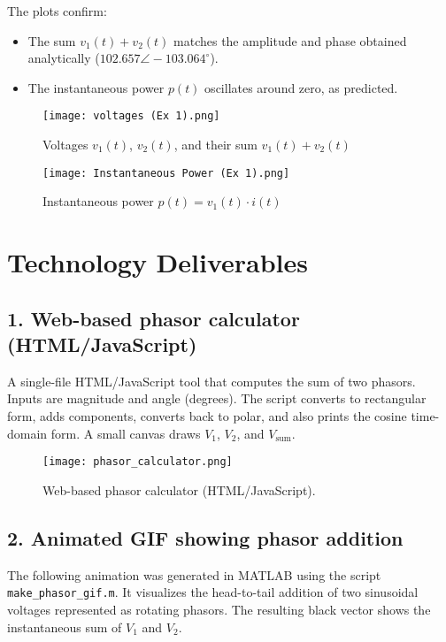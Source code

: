 \documentclass{article}
\begin{document}
The plots confirm:
\begin{itemize}
\item The sum \(v_1(t)+v_2(t)\) matches the amplitude and phase 
      obtained analytically (\(102.657\angle -103.064^\circ\)).
\item The instantaneous power \(p(t)\) oscillates around zero, as predicted.
\end{itemize}


\begin{figure}[H]
\centering
\texttt{[image: voltages (Ex 1).png]}
\caption{Voltages $v_1(t)$, $v_2(t)$, and their sum $v_1(t)+v_2(t)$}
\end{figure}

\begin{figure}[H]
\centering
\texttt{[image: Instantaneous Power (Ex 1).png]}
\caption{Instantaneous power $p(t) = v_1(t) \cdot i(t)$}
\end{figure}



\section*{Technology Deliverables}

\subsection*{1. Web-based phasor calculator (HTML/JavaScript)}
A single-file HTML/JavaScript tool that computes the sum of two phasors.
Inputs are magnitude and angle (degrees). The script converts to rectangular
form, adds components, converts back to polar, and also prints the cosine
time-domain form. A small canvas draws \(V_1\), \(V_2\), and \(V_{\text{sum}}\).

\begin{figure}[H]
  \centering
  \texttt{[image: phasor\_calculator.png]}
  \caption{Web-based phasor calculator (HTML/JavaScript).}
\end{figure}

\subsection*{2. Animated GIF showing phasor addition}
The following animation was generated in MATLAB using the script
\texttt{make\_phasor\_gif.m}. It visualizes the head-to-tail addition of two
sinusoidal voltages represented as rotating phasors. The resulting black vector
shows the instantaneous sum of \( V_1 \) and \( V_2 \).
\end{document}
